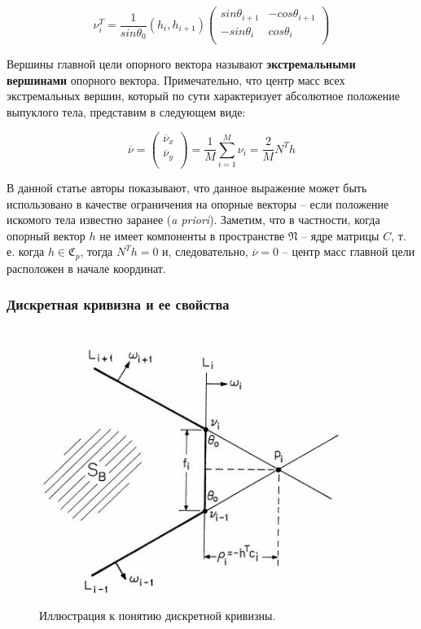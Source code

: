 \documentclass[a4paper, 12pt, titlepage]{article}
\theoremstyle{definition}
\theoremstyle{plain}
\theoremstyle{plain}
\begin{document}
\begin{equation}
\nu_{i}^{T} = \frac{1}{sin \theta_{0}} (h_{i},  h_{i + 1})
\left(
  \begin{array}{cc}
    sin \theta_{i + 1} & - cos \theta_{i + 1} \\
    - sin \theta_{i} & cos \theta_{i} \\
  \end{array}
\right)
\end{equation}

Вершины главной цели опорного вектора называют \textbf{экстремальными вершинами}
опорного вектора. Примечательно, что центр масс всех экстремальных вершин,
который по сути характеризует абсолютное положение выпуклого тела, представим
в следующем виде:

\begin{equation}
\overline{\nu} = \left(
  \begin{array}{c}
   \overline{\nu}_{x} \\
   \overline{\nu}_{y} \\
  \end{array}
  \right) =
  \frac{1}{M} \sum\limits_{i = 1}^{M} \nu_{i} = \frac{2}{M} N^{T} h
\end{equation}

В данной статье авторы показывают, что данное выражение может быть использовано
в качестве ограничения на опорные векторы -- если положение искомого тела
известно заранее (\textit{a priori}). Заметим, что в частности, когда опорный
вектор $h$ не имеет компоненты в пространстве $\mathfrak{N}$ -- ядре матрицы
$C$, т. е. когда $h \in \mathfrak{C}_{p}$, тогда $N^{T} h = 0$ и, следовательно,
$\overline{\nu} = 0$ -- центр масс главной цели расположен в начале координат.

\subsubsection{Дискретная кривизна и ее свойства}

\begin{figure}[ht]
    \includegraphics[width=10cm]{images/dicrete-radius-curvature.jpg}
    \caption{Иллюстрация к понятию дискретной кривизны.}
    \label{dicrete-radius-curvature}
\end{figure}
\end{document}
